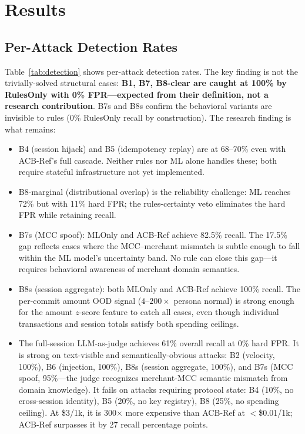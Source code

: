 \documentclass{article}
\begin{document}
\section{Results}
\label{sec:results}

\subsection{Per-Attack Detection Rates}

Table~\ref{tab:detection} shows per-attack detection rates. The key finding is
not the trivially-solved structural cases: \textbf{B1, B7, B8-clear are caught
at 100\% by RulesOnly with 0\% FPR---expected from their definition, not a
research contribution}. B7s and B8s confirm the behavioral variants are invisible
to rules (0\% RulesOnly recall by construction). The research finding is what remains:
\begin{itemize}
  \item B4 (session hijack) and B5 (idempotency replay) are at 68--70\% even
    with ACB-Ref's full cascade. Neither rules nor ML alone handles these; both
    require stateful infrastructure not yet implemented.
  \item B8-marginal (distributional overlap) is the reliability challenge: ML
    reaches 72\% but with 11\% hard FPR; the rules-certainty veto eliminates
    the hard FPR while retaining recall.
  \item B7s (MCC spoof): MLOnly and ACB-Ref achieve 82.5\% recall. The 17.5\% gap
    reflects cases where the MCC--merchant mismatch is subtle enough to fall
    within the ML model's uncertainty band. No rule can close this gap---it
    requires behavioral awareness of merchant domain semantics.
  \item B8s (session aggregate): both MLOnly and ACB-Ref achieve 100\% recall. The
    per-commit amount OOD signal ($4$--$200\times$ persona normal) is strong
    enough for the amount $z$-score feature to catch all cases, even though
    individual transactions and session totals satisfy both spending ceilings.
  \item The full-session LLM-as-judge achieves 61\% overall recall at 0\% hard FPR.
    It is strong on text-visible and semantically-obvious attacks: B2 (velocity, 100\%),
    B6 (injection, 100\%), B8s (session aggregate, 100\%), and B7s (MCC spoof, 95\%---the
    judge recognizes merchant-MCC semantic mismatch from domain knowledge). It fails on
    attacks requiring protocol state: B4 (10\%, no cross-session identity), B5 (20\%, no
    key registry), B8 (25\%, no spending ceiling). At \$3/1k, it is 300$\times$ more
    expensive than ACB-Ref at $<$\$0.01/1k; ACB-Ref surpasses it by 27 recall percentage points.
\end{itemize}
\end{document}
